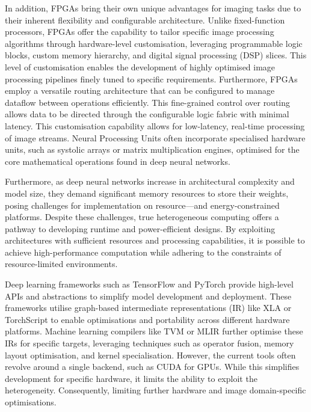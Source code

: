 \documentclass[]{spie}  %
\begin{document}
In addition, FPGAs bring their own unique advantages for imaging tasks due to their inherent flexibility and configurable architecture. Unlike fixed-function processors, FPGAs offer the capability to tailor specific image processing algorithms through hardware-level customisation, leveraging programmable logic blocks, custom memory hierarchy, and digital signal processing (DSP) slices. This level of customisation enables the development of highly optimised image processing pipelines finely tuned to specific requirements. Furthermore, FPGAs employ a versatile routing architecture that can be configured to manage dataflow between operations efficiently. This fine-grained control over routing allows data to be directed through the configurable logic fabric with minimal latency. This customisation capability allows for low-latency, real-time processing of image streams. Neural Processing Units often incorporate specialised hardware units, such as systolic arrays or matrix multiplication engines, optimised for the core mathematical operations found in deep neural networks.

Furthermore, as deep neural networks increase in architectural complexity and model size, they demand significant memory resources to store their weights, posing challenges for implementation on resource—and energy-constrained platforms. Despite these challenges, true heterogeneous computing offers a pathway to developing runtime and power-efficient designs. By exploiting architectures with sufficient resources and processing capabilities, it is possible to achieve high-performance computation while adhering to the constraints of resource-limited environments.

Deep learning frameworks such as TensorFlow\cite{tensorflow2015} and PyTorch\cite{Pytorch} provide high-level APIs and abstractions to simplify model development and deployment. These frameworks utilise graph-based intermediate representations (IR) like XLA or TorchScript to enable optimisations and portability across different hardware platforms. Machine learning compilers like TVM\cite{chen2018} or MLIR\cite{mlir} further optimise these IRs for specific targets, leveraging techniques such as operator fusion, memory layout optimisation, and kernel specialisation. However, the current tools often revolve around a single backend, such as CUDA for GPUs. While this simplifies development for specific hardware, it limits the ability to exploit the heterogeneity. Consequently, limiting further hardware and image domain-specific optimisations\cite{ali2023domain}.
\end{document}
